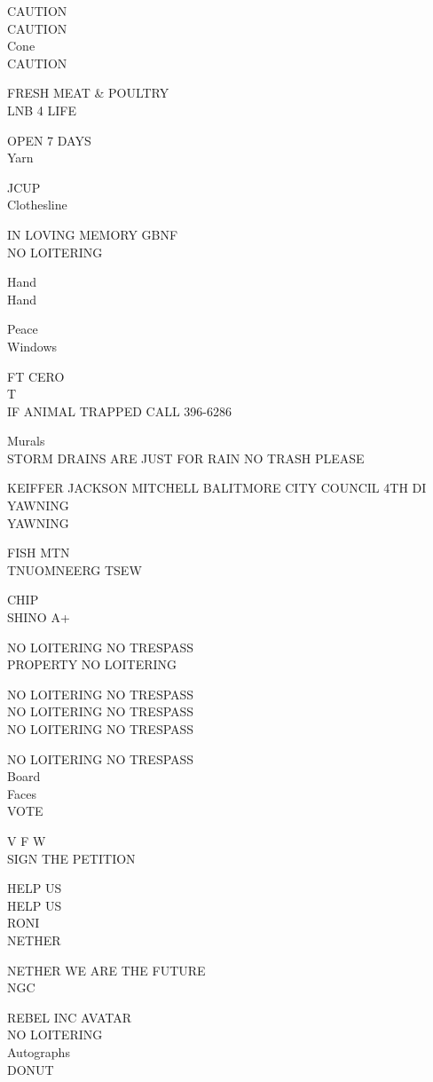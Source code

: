 \documentclass[10pt,letterpaper]{article}
\begin{document}
CAUTION\\
CAUTION\\
Cone\\
CAUTION

FRESH MEAT \& POULTRY\\
LNB 4 LIFE

OPEN 7 DAYS\\
Yarn

JCUP\\
Clothesline

IN LOVING MEMORY GBNF\\
NO LOITERING

Hand\\
Hand

Peace\\
Windows

FT CERO\\
T\\
IF ANIMAL TRAPPED CALL 396{-}6286

Murals\\
STORM DRAINS ARE JUST FOR RAIN NO TRASH PLEASE

KEIFFER JACKSON MITCHELL BALITMORE CITY COUNCIL 4TH DI\\
YAWNING\\
YAWNING

FISH MTN\\
TNUOMNEERG TSEW

CHIP\\
SHINO A+

NO LOITERING NO TRESPASS\\
PROPERTY NO LOITERING

NO LOITERING NO TRESPASS\\
NO LOITERING NO TRESPASS\\
NO LOITERING NO TRESPASS

NO LOITERING NO TRESPASS\\
Board\\
Faces\\
VOTE

V F W\\
SIGN THE PETITION

HELP US\\
HELP US\\
RONI\\
NETHER

NETHER WE ARE THE FUTURE\\
NGC

REBEL INC AVATAR\\
NO LOITERING\\
Autographs\\
DONUT
\end{document}
